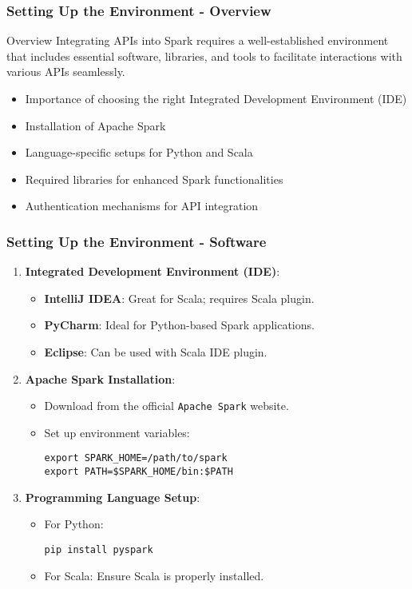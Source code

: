 \documentclass[aspectratio=169]{beamer}
\begin{document}
\begin{frame}[fragile]
    \frametitle{Setting Up the Environment - Overview}
    \begin{block}{Overview}
        Integrating APIs into Spark requires a well-established environment that includes essential software, libraries, and tools to facilitate interactions with various APIs seamlessly.
    \end{block}
    \begin{itemize}
        \item Importance of choosing the right Integrated Development Environment (IDE)
        \item Installation of Apache Spark
        \item Language-specific setups for Python and Scala
        \item Required libraries for enhanced Spark functionalities
        \item Authentication mechanisms for API integration
    \end{itemize}
\end{frame}

\begin{frame}[fragile]
    \frametitle{Setting Up the Environment - Software}
    \begin{enumerate}
        \item \textbf{Integrated Development Environment (IDE)}:
        \begin{itemize}
            \item \textbf{IntelliJ IDEA}: Great for Scala; requires Scala plugin.
            \item \textbf{PyCharm}: Ideal for Python-based Spark applications.
            \item \textbf{Eclipse}: Can be used with Scala IDE plugin.
        \end{itemize}
        
        \item \textbf{Apache Spark Installation}:
        \begin{itemize}
            \item Download from the official \texttt{Apache Spark} website.
            \item Set up environment variables:
            \begin{lstlisting}
export SPARK_HOME=/path/to/spark
export PATH=$SPARK_HOME/bin:$PATH
            \end{lstlisting}
        \end{itemize}
        
        \item \textbf{Programming Language Setup}:
        \begin{itemize}
            \item For Python:
            \begin{lstlisting}
pip install pyspark
            \end{lstlisting}
            \item For Scala: Ensure Scala is properly installed.
        \end{itemize}
    \end{enumerate}
\end{frame}
\end{document}
